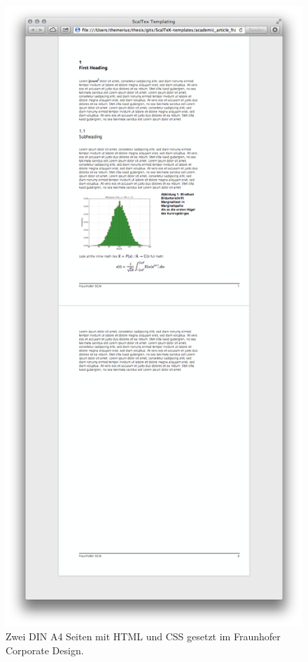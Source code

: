 \newpage
\begin{figure}[h!]
  \centering
    \includegraphics[height=0.9\textheight]{figures/two_pages.png}
  \caption{Zwei DIN A4 Seiten mit HTML und CSS gesetzt im Fraunhofer Corporate Design.}\label{fig-one_page}
\end{figure}
\newpage

